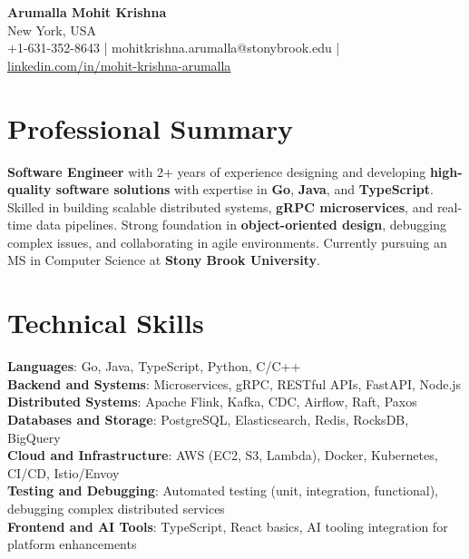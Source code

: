 

\begin{center}
  {\Large \textbf{Arumalla Mohit Krishna}} \\
  New York, USA \\
  +1-631-352-8643 \enspace | \enspace mohitkrishna.arumalla@stonybrook.edu \enspace | \enspace \href{https://www.linkedin.com/in/mohit-krishna-arumalla}{linkedin.com/in/mohit-krishna-arumalla}
\end{center}

\section{Professional Summary}
  \begin{itemize}[leftmargin=0.15in, label={}]
    \small{\item{
     \textbf{Software Engineer} with 2+ years of experience designing and developing \textbf{high-quality software solutions} with expertise in \textbf{Go}, \textbf{Java}, and \textbf{TypeScript}. Skilled in building scalable distributed systems, \textbf{gRPC microservices}, and real-time data pipelines. Strong foundation in \textbf{object-oriented design}, debugging complex issues, and collaborating in agile environments. Currently pursuing an MS in Computer Science at \textbf{Stony Brook University}.
    }}
  \end{itemize}
\vspace{-16pt}

\section{Technical Skills}
 \begin{itemize}[leftmargin=0.15in, label={}]
    \small{\item{
     \textbf{Languages}: Go, Java, TypeScript, Python, C/C++ \\
     \textbf{Backend and Systems}: Microservices, gRPC, RESTful APIs, FastAPI, Node.js \\
     \textbf{Distributed Systems}: Apache Flink, Kafka, CDC, Airflow, Raft, Paxos \\
     \textbf{Databases and Storage}: PostgreSQL, Elasticsearch, Redis, RocksDB, BigQuery \\
     \textbf{Cloud and Infrastructure}: AWS (EC2, S3, Lambda), Docker, Kubernetes, CI/CD, Istio/Envoy \\
     \textbf{Testing and Debugging}: Automated testing (unit, integration, functional), debugging complex distributed services \\
     \textbf{Frontend and AI Tools}: TypeScript, React basics, AI tooling integration for platform enhancements
    }}
 \end{itemize}
\vspace{-16pt}

